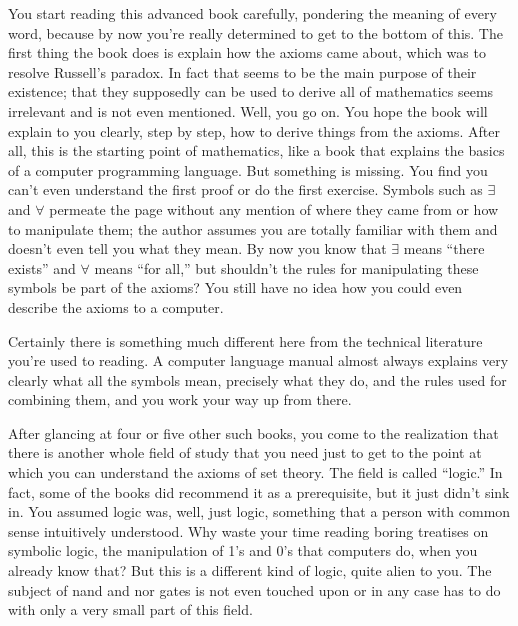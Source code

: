 You start reading this advanced book carefully, pondering the meaning of every
word, because by now you're really determined to get to the bottom of this.
The first thing the book does is explain how the axioms came about, which was
to resolve Russell's paradox.  In fact that seems to
be the main purpose of their existence; that they supposedly can be used to
derive all of mathematics seems irrelevant and is not even mentioned.  Well,
you go on.  You hope the book will explain to you clearly, step by step, how
to derive things from the axioms.  After all, this is the starting point of
mathematics, like a book that explains the basics of a computer programming
language.  But something is missing.  You find you can't even understand the
first proof or do the first exercise.  Symbols such as $\exists$ and $\forall$
permeate the page without any mention of where they came from or how to
manipulate them; the author assumes you are totally familiar with them and
doesn't even tell you what they mean.  By now you know that $\exists$ means
``there exists'' and $\forall$ means ``for all,'' but shouldn't the rules for
manipulating these symbols be part of the axioms?  You still have no idea
how you could even describe the axioms to a computer.

Certainly there is something much different here from the technical
literature you're used to reading.  A computer language manual almost
always explains very clearly what all the symbols mean, precisely what
they do, and the rules used for combining them, and you work your way up
from there.

After glancing at four or five other such books, you come to the realization
that there is another whole field of study that you need just to get to the
point at which you can understand the axioms of set theory.  The field is
called ``logic.''  In fact, some of the books did recommend it as a
prerequisite, but it just didn't sink in.  You assumed logic was, well, just
logic, something that a person with common sense intuitively understood.  Why
waste your time reading boring treatises on symbolic logic, the manipulation
of 1's and 0's that computers do, when you already know that?  But this is a
different kind of logic, quite alien to you.  The subject of {\sc nand} and
{\sc nor} gates is not even touched upon or in any case has to do with only a
very small part of this field.

